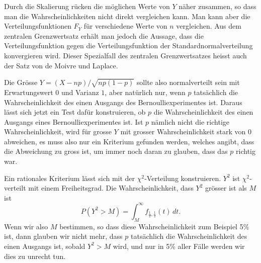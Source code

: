 Durch die Skalierung rücken die möglichen Werte von $Y$ näher zusammen,
so dass man die Wahrscheinlichkeiten nicht direkt vergleichen kann.
Man kann aber die Verteilungsfunktionen $F_Y$ für verschiedene Werte
von $n$ vergleichen.
Aus dem zentralen Grenzwertsatz erhält man
jedoch die Aussage, dass die Verteilungsfunktion gegen die
Verteilungsfunktion der Standardnormalverteilung konvergieren wird.
Dieser Spezialfall des zentralen Grenzwertsatzes heisst auch der
Satz von de Moivre und Laplace.

Die Grösse $Y=(X-np)/\sqrt{np(1-p)}$ sollte also normalverteilt sein
mit Erwartungswert $0$ und Varianz $1$, aber natürlich nur, wenn $p$
tatsächlich die Wahrscheinlichkeit des einen Ausgangs des
Bernoulliexperimentes ist.
Daraus lässt sich jetzt ein Test dafür
konstruieren, ob $p$ die Wahrscheinlichkeit des einen Ausgangs eines
Bernoulliexperimentes ist.
Ist $p$ nämlich nicht die richtige
Wahrscheinlichkeit, wird für grosse $Y$ mit grosser Wahrscheinlichkeit
stark von $0$ abweichen, es muss also nur ein Kriterium gefunden werden,
welches angibt, dass die Abweichung zu gross ist, um immer noch daran
zu glauben, dass das $p$ richtig war.

Ein rationales Kriterium lässt sich mit der $\chi^2$-Verteilung konstruieren.
$Y^2$ ist $\chi^2$-verteilt mit einem Freiheitsgrad.
Die Wahrscheinlichkeit, dass $Y^2$ grösser ist als $M$ ist
\[
P(Y^2>M)=\int_M^\infty f_{\frac12,\frac12}(t)\,dt.
\]
Wenn wir also $M$ bestimmen, so dass diese Wahrscheinlichkeit 
zum Beispiel 5\% ist, dann glauben wir nicht mehr, dass $p$ tatsächlich
die Wahrscheinlichkeit des einen Ausgangs ist, sobald $Y^2>M$ wird,
und nur in 5\% aller Fälle werden wir dies zu unrecht tun.
